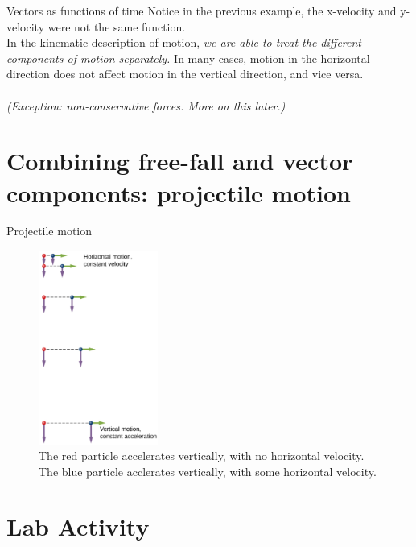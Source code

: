\documentclass{beamer}
\begin{document}
\begin{frame}{Vectors as functions of time}
Notice in the previous example, the x-velocity and y-velocity were not the same function. \\
\vspace{0.5cm}
In the kinematic description of motion, \alert{\textit{we are able to treat the different components of motion separately.}}  In many cases, motion in the horizontal direction does not affect motion in the vertical direction, and vice versa.\\
\vspace{0.5cm}
\small
{} \\
\vspace{1cm}
\textit{(Exception: non-conservative forces.  More on this later.)}
\end{frame}

\section{Combining free-fall and vector components: projectile motion}

\begin{frame}{Projectile motion}
\small
\begin{figure}
\centering
\includegraphics[width=0.35\textwidth]{figures/fall.png}
\caption{\label{fig:fall} The red particle accelerates vertically, with no horizontal velocity.  The blue particle acclerates vertically, with some horizontal velocity.}
\end{figure}
\end{frame}

\section{Lab Activity}
\end{document}
